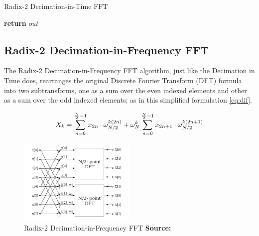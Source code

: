 \documentclass[
  oneside,
  11pt, a4paper,
  footinclude=true,
  headinclude=true,
  cleardoublepage=empty
]{scrbook}
\newcommand*{\source}[1]{%
    \textbf{Source:} \cite{#1}%
}
\begin{document}
\begin{algorithm}
    \caption{Radix-2 Decimation-in-Time FFT} \label{alg:dit}


    \textbf{return} $out$\;
\end{algorithm}

\subsection{Radix-2 Decimation-in-Frequency FFT} \label{subsec:radix-2-decimation-in-frequency-fft}

The Radix-2 Decimation-in-Frequency FFT algorithm, just like the Decimation in Time does, rearranges the original Discrete Fourier Transform (DFT) formula into two subtransforms, one as a sum over the even indexed elements and other as a sum over the odd indexed elements; as in this simplified formulation \autoref{eq:dif}.

\begin{equation} \label{eq:dif}
    X_{k} = \sum_{n=0}^{\frac{N}{2}-1}x_{2n} \cdot \omega_{N/2}^{k(2n)} + \omega_{N}^{k} \sum_{n=0}^{\frac{N}{2}-1}x_{2n+1} \cdot \omega_{N/2}^{k(2n+1)} \\
\end{equation}

\begin{figure}[h] 
    \centering
    \includegraphics[width=0.5\textwidth]{imgs/dif_fft.png}
    \caption{Radix-2 Decimation-in-Frequency FFT \source{jones2014digital}}
    \label{fig:dif-fft}
\end{figure}
\end{document}
